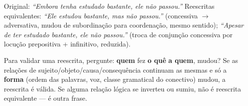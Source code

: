 \begin{exemplo}
Original: \textit{“Embora tenha estudado bastante, ele não passou.”}
Reescritas equivalentes: \textit{“Ele estudou bastante, mas não passou.”}
(concessiva $\to$ adversativa, mudou de subordinação para coordenação, mesmo
sentido); \textit{“Apesar de ter estudado bastante, ele não passou.”}
(troca de conjunção concessiva por locução prepositiva + infinitivo,
reduzida).
\end{exemplo}

\begin{regrapratica}
Para validar uma reescrita, pergunte: \textbf{quem} fez \textbf{o quê}
\textbf{a quem}, mudou? Se as relações de sujeito/objeto/causa/consequência
continuam as mesmas e só a \textbf{forma} (ordem das palavras, voz, classe
gramatical do conectivo) mudou, a reescrita é válida. Se alguma relação
lógica se inverteu ou sumiu, não é reescrita equivalente --- é outra frase.
\end{regrapratica}

